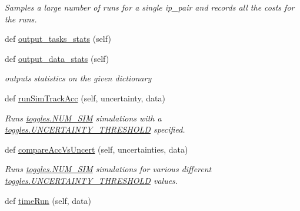 \begin{DoxyCompactItemize}
\begin{DoxyCompactList}\small\item\em Samples a large number of runs for a single ip\+\_\+pair and records all the costs for the runs. \end{DoxyCompactList}\item 
def \mbox{\hyperlink{classdynamicfilterapp_1_1test__simulations_1_1_simulation_test_aed5cf6d5470f93d7a538e4c2c7a8bb34}{output\+\_\+tasks\+\_\+stats}} (self)
\item 
def \mbox{\hyperlink{classdynamicfilterapp_1_1test__simulations_1_1_simulation_test_a6dfab9d9ce87cf8f1421f01d5e9051e0}{output\+\_\+data\+\_\+stats}} (self)
\begin{DoxyCompactList}\small\item\em outputs statistics on the given dictionary \end{DoxyCompactList}\item 
def \mbox{\hyperlink{classdynamicfilterapp_1_1test__simulations_1_1_simulation_test_a87a8325e13e3f2641a3371a9c72c9583}{run\+Sim\+Track\+Acc}} (self, uncertainty, data)
\begin{DoxyCompactList}\small\item\em Runs \mbox{\hyperlink{namespacedynamicfilterapp_1_1toggles_a3baf5565851cd87736238d8dddfc1106}{toggles.\+N\+U\+M\+\_\+\+S\+IM}} simulations with a \mbox{\hyperlink{namespacedynamicfilterapp_1_1toggles_aaefdc27b85545eb4a910f5c65f7d8bbb}{toggles.\+U\+N\+C\+E\+R\+T\+A\+I\+N\+T\+Y\+\_\+\+T\+H\+R\+E\+S\+H\+O\+LD}} specified. \end{DoxyCompactList}\item 
def \mbox{\hyperlink{classdynamicfilterapp_1_1test__simulations_1_1_simulation_test_a1395b2cd07f422278160348baec14c9b}{compare\+Acc\+Vs\+Uncert}} (self, uncertainties, data)
\begin{DoxyCompactList}\small\item\em Runs \mbox{\hyperlink{namespacedynamicfilterapp_1_1toggles_a3baf5565851cd87736238d8dddfc1106}{toggles.\+N\+U\+M\+\_\+\+S\+IM}} simulations for various different \mbox{\hyperlink{namespacedynamicfilterapp_1_1toggles_aaefdc27b85545eb4a910f5c65f7d8bbb}{toggles.\+U\+N\+C\+E\+R\+T\+A\+I\+N\+T\+Y\+\_\+\+T\+H\+R\+E\+S\+H\+O\+LD}} values. \end{DoxyCompactList}\item 
def \mbox{\hyperlink{classdynamicfilterapp_1_1test__simulations_1_1_simulation_test_a6977d93287474dfe398931c8c0b381c3}{time\+Run}} (self, data)

\end{DoxyCompactItemize}
